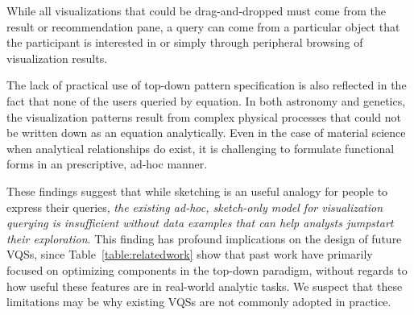 While all visualizations that could be drag-and-dropped must come from the result or recommendation pane, a query can come from a particular object that the participant is interested in or simply through peripheral browsing of visualization results.
\par The lack of practical use of top-down pattern specification is also reflected in the fact that none of the users queried by equation. In both astronomy and genetics, the visualization patterns result from complex physical processes that could not be written down as an equation analytically. Even in the case of material science when analytical relationships do exist, it is challenging to formulate functional forms in an prescriptive, ad-hoc manner.
\par These findings suggest that while sketching is an useful analogy for people to express their queries, \emph{the existing ad-hoc, sketch-only model for visualization querying is insufficient without data examples that can help analysts jumpstart their exploration}. This finding has profound implications on the design of future VQSs, since Table~\ref{table:relatedwork} show that past work have primarily focused on optimizing components in the top-down paradigm, without regards to how useful these features are in real-world analytic tasks.
We suspect that these limitations may be why existing VQSs are not commonly adopted in practice. %

